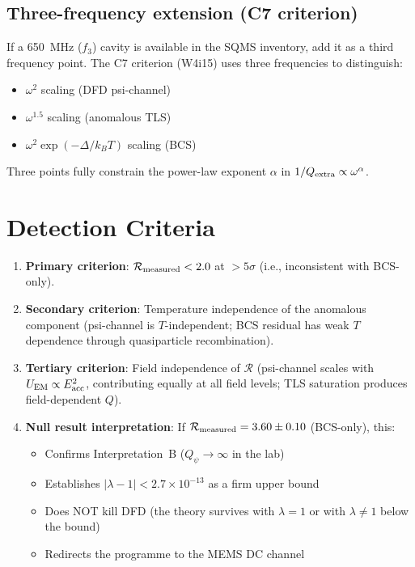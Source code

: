 \documentclass[11pt]{article}
\newcommand{\ee}[1]{\times 10^{#1}}
\newcommand{\Qpsi}{Q_\psi}
\newcommand{\lbone}{|\lambda - 1|}
\theoremstyle{definition}
\theoremstyle{remark}
\begin{document}
\subsection{Three-frequency extension (C7 criterion)}

If a 650~MHz ($f_3$) cavity is available in the SQMS inventory, add it
as a third frequency point. The C7 criterion (W4i15) uses three
frequencies to distinguish:
\begin{itemize}[nosep]
\item $\omega^2$ scaling (DFD psi-channel)
\item $\omega^{1.5}$ scaling (anomalous TLS)
\item $\omega^2 \exp(-\Delta/k_BT)$ scaling (BCS)
\end{itemize}

Three points fully constrain the power-law exponent $\alpha$ in
$1/Q_{\rm extra} \propto \omega^\alpha$.


\section{Detection Criteria}

\begin{enumerate}
\item \textbf{Primary criterion}: $\mathcal{R}_{\rm measured}
  < 2.0$ at $>5\sigma$ (i.e., inconsistent with BCS-only).

\item \textbf{Secondary criterion}: Temperature independence of
  the anomalous component (psi-channel is $T$-independent;
  BCS residual has weak $T$ dependence through quasiparticle
  recombination).

\item \textbf{Tertiary criterion}: Field independence of
  $\mathcal{R}$ (psi-channel scales with $U_{\rm EM} \propto
  E_{\rm acc}^2$, contributing equally at all field levels;
  TLS saturation produces field-dependent $Q$).

\item \textbf{Null result interpretation}: If $\mathcal{R}_{\rm measured}
  = 3.60 \pm 0.10$ (BCS-only), this:
  \begin{itemize}[nosep]
  \item Confirms Interpretation~B ($\Qpsi \to \infty$ in the lab)
  \item Establishes $\lbone < 2.7\ee{-13}$ as a firm upper bound
  \item Does NOT kill DFD (the theory survives with $\lambda = 1$
    or with $\lambda \neq 1$ below the bound)
  \item Redirects the programme to the MEMS DC channel
  \end{itemize}
\end{enumerate}
\end{document}
